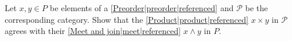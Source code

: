 
Let $x,y \in P$ be elements of a \ref{Preorder|preorder|referenced} and $\mathcal{P}$ be the corresponding category. Show that the \ref{Product|product|referenced} $x \times y$ in $\mathcal{P}$ agrees with their \ref{Meet and join|meet|referenced} $x \land y$ in $P$.